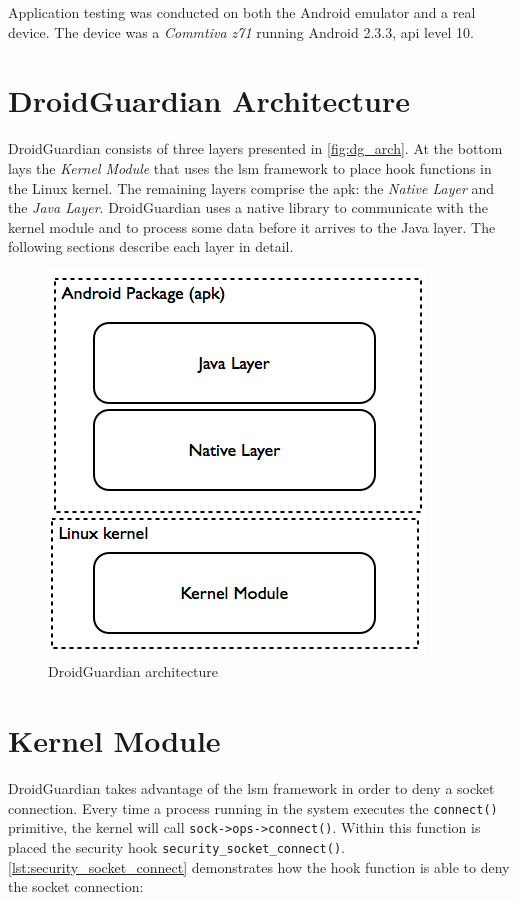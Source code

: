 Application testing was conducted on both the Android emulator and a real device. The device was a \textit{Commtiva z71} running Android 2.3.3, \gls{api} level 10.

\section{DroidGuardian Architecture}

DroidGuardian consists of three layers presented in \autoref{fig:dg_arch}. At the bottom lays the \textit{Kernel Module} that uses the \gls{lsm} framework to place hook functions in the Linux kernel. The remaining layers comprise the \gls{apk}: the \textit{Native Layer} and the \textit{Java Layer}. DroidGuardian uses a native library to communicate with the kernel module and to process some data before it arrives to the Java layer. The following sections describe each layer in detail.

\begin{figure}[h]
 \centering
 \includegraphics[scale=0.5]{figures/dg_arch.png}
 \caption{DroidGuardian architecture}
 \label{fig:dg_arch}
\end{figure}


\section{Kernel Module}

DroidGuardian takes advantage of the \gls{lsm} framework in order to deny a socket connection. Every time a process running in the system executes the \texttt{connect()} primitive, the kernel will call \texttt{sock->ops->connect()}. Within this function is placed the security hook \texttt{security\_socket\_connect()}. \autoref{lst:security_socket_connect} demonstrates how the hook function is able to deny the socket connection:

